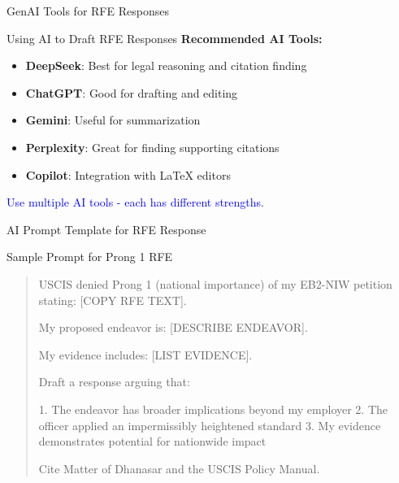 \documentclass[11pt]{beamer}
\begin{document}
	
	\begin{frame}{GenAI Tools for RFE Responses}
		\scriptsize
		\begin{block}{Using AI to Draft RFE Responses}
			\textbf{Recommended AI Tools:}
			\begin{itemize}
				\item \textbf{DeepSeek}: Best for legal reasoning and citation finding
				\item \textbf{ChatGPT}: Good for drafting and editing
				\item \textbf{Gemini}: Useful for summarization
				\item \textbf{Perplexity}: Great for finding supporting citations
				\item \textbf{Copilot}: Integration with LaTeX editors
			\end{itemize}
			\textcolor{blue}{Use multiple AI tools - each has different strengths.}
		\end{block}
	\end{frame}
	
	\begin{frame}{AI Prompt Template for RFE Response}
		\scriptsize
		\begin{block}{Sample Prompt for Prong 1 RFE}
			\begin{quote}
				USCIS denied Prong 1 (national importance) of my EB2-NIW petition stating: [COPY RFE TEXT].
				
				My proposed endeavor is: [DESCRIBE ENDEAVOR].
				
				My evidence includes: [LIST EVIDENCE].
				
				Draft a response arguing that:
				
				1. The endeavor has broader implications beyond my employer
				2. The officer applied an impermissibly heightened standard
				3. My evidence demonstrates potential for nationwide impact
				
				Cite Matter of Dhanasar and the USCIS Policy Manual.
			\end{quote}
		\end{block}
	\end{frame}
	
\end{document}
